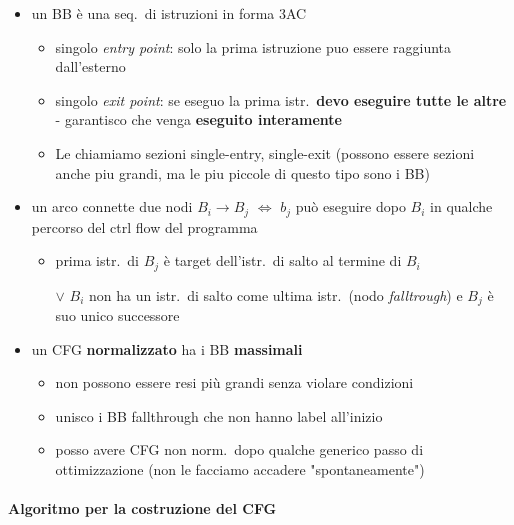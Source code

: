 \begin{itemize}
  \item un BB \`e una seq.~di istruzioni in forma 3AC
    \begin{itemize}
      \item singolo \textit{entry point}: solo la prima istruzione puo essere raggiunta dall'esterno
      \item singolo \textit{exit point}: se eseguo la prima istr.~\textbf{devo eseguire tutte le altre} - garantisco che venga \textbf{eseguito interamente}
      \item Le chiamiamo sezioni single-entry, single-exit (possono essere sezioni anche piu grandi, ma le piu piccole di questo tipo sono i BB)
    \end{itemize}
  \item un arco connette due nodi $B_{i}\rightarrow B_{j}$ $\iff$ $b_{j}$ pu\`o eseguire dopo $B_{i}$ in qualche percorso del ctrl flow del programma
    \begin{itemize}
      \item prima istr.~di $B_{j}$ \`e target dell'istr.~di salto al termine di $B_{i}$
      \item[$\lor$] $B_{i}$ non ha un istr.~di salto come ultima istr.~(nodo \textit{falltrough}) e $B_{j}$ \`e suo unico successore
    \end{itemize}
  \item un CFG \textbf{normalizzato} ha i BB \textbf{massimali}
    \begin{itemize}
      \item non possono essere resi pi\`u grandi senza violare condizioni
      \item unisco i BB fallthrough che non hanno label all'inizio
      \item posso avere CFG non norm.~dopo qualche generico passo di ottimizzazione (non le facciamo accadere "spontaneamente")
    \end{itemize}
\end{itemize}

\paragraph{Algoritmo per la costruzione del CFG}~\\

